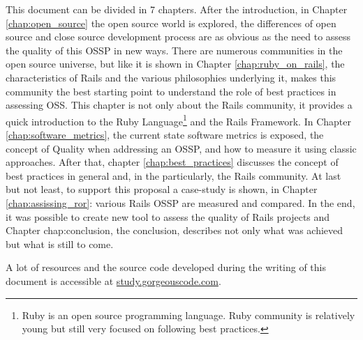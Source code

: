 This document can be divided in 7 chapters.
After the introduction, in Chapter \ref{chap:open_source} the open source world is explored,
the differences of open source and close source development process
are as obvious as the need to assess the quality of this OSSP in new ways.
There are numerous communities in the open source universe, but like it is shown in Chapter \ref{chap:ruby_on_rails},
the characteristics of Rails and the various philosophies underlying it, 
makes this community the best starting point to understand the role of best practices in assessing OSS.
This chapter is not only about the Rails community, it provides a quick introduction to the \textsf{Ruby Language}\footnote{
  Ruby is an open source programming language. Ruby community is relatively young but still very focused on following best practices.
} and the Rails Framework.
In Chapter \ref{chap:software_metrics}, the current state software metrics is exposed,
the concept of Quality when addressing an OSSP, and how to measure it using classic approaches.
After that, chapter \ref{chap:best_practices} discusses the concept of best practices in general and, 
in the particularly, the Rails community.
At last but not least, to support this proposal a case-study is shown, in Chapter \ref{chap:assissing_ror}: 
various Rails OSSP are measured and compared. 
In the end, it was possible to create new tool to assess the quality of Rails projects and 
Chapter {chap:conclusion}, the conclusion, describes not only what was achieved but what is still to come.

A lot of resources and the source code developed during the writing of this document is accessible at 
\url{study.gorgeouscode.com}.
